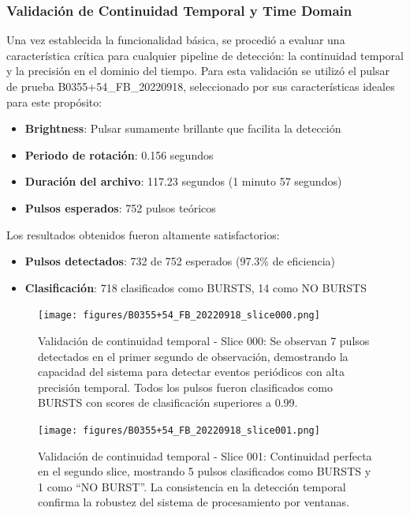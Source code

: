 \subsubsection{Validación de Continuidad Temporal y Time Domain}

Una vez establecida la funcionalidad básica, se procedió a evaluar una característica crítica para cualquier pipeline de detección: la continuidad temporal y la precisión en el dominio del tiempo. Para esta validación se utilizó el pulsar de prueba B0355+54\_FB\_20220918, seleccionado por sus características ideales para este propósito:

\begin{itemize}
    \item \textbf{Brightness}: Pulsar sumamente brillante que facilita la detección
    \item \textbf{Periodo de rotación}: 0.156 segundos
    \item \textbf{Duración del archivo}: 117.23 segundos (1 minuto 57 segundos)
    \item \textbf{Pulsos esperados}: 752 pulsos teóricos
\end{itemize}

Los resultados obtenidos fueron altamente satisfactorios:
\begin{itemize}
    \item \textbf{Pulsos detectados}: 732 de 752 esperados (97.3\% de eficiencia)
    \item \textbf{Clasificación}: 718 clasificados como BURSTS, 14 como NO BURSTS
\end{itemize}

\begin{figure}[H]
    \centering
    \texttt{[image: figures/B0355+54\_FB\_20220918\_slice000.png]}
    \caption[Validación continuidad temporal: Slice 000]{Validación de continuidad temporal - Slice 000: Se observan 7 pulsos detectados en el primer segundo de observación, demostrando la capacidad del sistema para detectar eventos periódicos con alta precisión temporal. Todos los pulsos fueron clasificados como BURSTS con scores de clasificación superiores a 0.99.}
    \label{fig:b0355_slice000}
\end{figure}


\begin{figure}[H]
    \centering
    \texttt{[image: figures/B0355+54\_FB\_20220918\_slice001.png]}
    \caption[Validación continuidad temporal: Slice 001]{Validación de continuidad temporal - Slice 001: Continuidad perfecta en el segundo slice, mostrando 5 pulsos clasificados como BURSTS y 1 como ``NO BURST''. La consistencia en la detección temporal confirma la robustez del sistema de procesamiento por ventanas.}
    \label{fig:b0355_slice001}
\end{figure}

